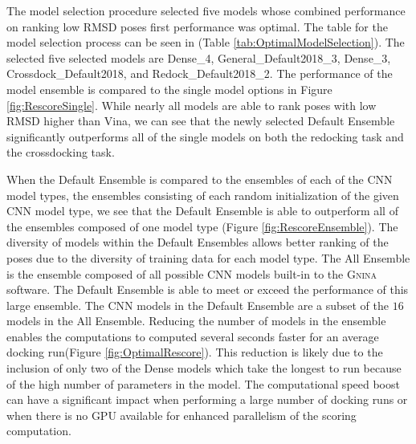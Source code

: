 \documentclass[journal=jcisd8,manuscript=article]{achemso}
\begin{document}
The model selection procedure selected five models whose combined performance on ranking low RMSD poses first performance was optimal. The table for the model selection process can be seen in (Table \ref{tab:OptimalModelSelection}). The selected five selected models are Dense\_4, General\_Default2018\_3, Dense\_3, Crossdock\_Default2018, and Redock\_Default2018\_2. The performance of the model ensemble is compared to the single model options in Figure \ref{fig:RescoreSingle}. While nearly all models are able to rank poses with low RMSD higher than Vina, we can see that the newly selected Default Ensemble significantly outperforms all of the single models on both the redocking task and the crossdocking task.  

When the Default Ensemble is compared to the ensembles of each of the CNN model types, the ensembles consisting of each random initialization of the given CNN model type, we see that the Default Ensemble is able to outperform all of the ensembles composed of one model type (Figure \ref{fig:RescoreEnsemble}). The diversity of models within the Default Ensembles allows better ranking of the poses due to the diversity of training data for each model type. The All Ensemble is the ensemble composed of all possible CNN models built-in to the \textsc{Gnina} software. The Default Ensemble is able to meet or exceed the performance of this large ensemble. The CNN models in the Default Ensemble are a subset of the $16$ models in the All Ensemble. Reducing the number of models in the ensemble enables the computations to computed several seconds faster for an average docking run(Figure \ref{fig:OptimalRescore}). This reduction is likely due to the inclusion of only two of the Dense models which take the longest to run because of the high number of parameters in the model. The computational speed boost can have a significant impact when performing a large number of docking runs or when there is no GPU available for enhanced parallelism of the scoring computation.
\end{document}
